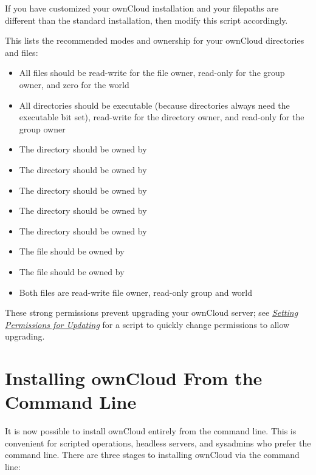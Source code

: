 \documentclass[letterpaper,10pt,english]{sphinxmanual}
\begin{document}
If you have customized your ownCloud installation and your filepaths are
different than the standard installation, then modify this script accordingly.

This lists the recommended modes and ownership for your ownCloud directories
and files:
\begin{itemize}
\item {} 
All files should be read-write for the file owner, read-only for the
group owner, and zero for the world

\item {} 
All directories should be executable (because directories always need the
executable bit set), read-write for the directory owner, and read-only for
the group owner

\item {} 
The  directory should be owned by 

\item {} 
The  directory should be owned by 

\item {} 
The  directory should be owned by 

\item {} 
The  directory should be owned by 

\item {} 
The  directory should be owned by 

\item {} 
The  file should be owned by 

\item {} 
The  file should be owned by 

\item {} 
Both  files are read-write file owner, read-only group and
world

\end{itemize}

These strong permissions prevent upgrading your ownCloud server;
see {\hyperref[maintenance/update:set\string-updating\string-permissions\string-label]{\emph{Setting Permissions for Updating}}} for a script to quickly change
permissions to allow upgrading.


\section{Installing ownCloud From the Command Line}
\label{installation/command_line_installation:installing-owncloud-from-the-command-line}\label{installation/command_line_installation::doc}
It is now possible to install ownCloud entirely from the command line. This is
convenient for scripted operations, headless servers, and sysadmins who prefer
the command line. There are three stages to installing ownCloud via the command
line:
\end{document}
